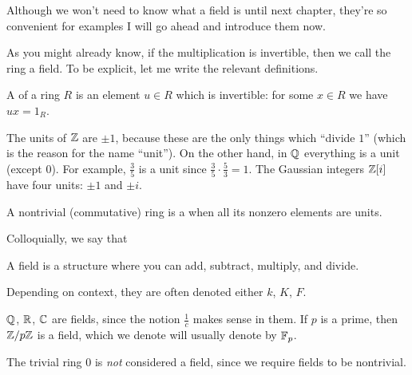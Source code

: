 Although we won't need to know what a field is until next chapter,
they're so convenient for examples I will go ahead and introduce them now.

As you might already know, if the multiplication is invertible,
then we call the ring a field.
To be explicit, let me write the relevant definitions.

\begin{definition}
	\label{def:unit}
	A  of a ring $R$
	is an element $u \in R$ which is invertible:
	for some $x \in R$ we have $ux = 1_R$.
\end{definition}

\begin{example}
	\listhack
	\begin{enumerate}[(a)]
	\ii The units of $\mathbb Z$ are $\pm 1$,
	because these are the only things which ``divide $1$''
	(which is the reason for the name ``unit'').
	\ii On the other hand, in $\mathbb Q$ everything is a unit (except $0$).
	For example, $\frac 35$ is a unit since
	$\frac 35 \cdot \frac 53 = 1$.
	\ii The Gaussian integers $\mathbb Z[i]$ have four units:
	$\pm 1$ and $\pm i$.
	\end{enumerate}
\end{example}

\begin{definition}
	A nontrivial (commutative) ring is a 
	when all its nonzero elements are units.
\end{definition}

Colloquially, we say that
\begin{moral}
	A field is a structure where you can add, subtract, multiply, and divide.
\end{moral}
Depending on context, they are often denoted
either $k$, $K$, $F$.

\begin{example}
	\listhack
	\begin{enumerate}[(a)]
		\ii $\mathbb Q$, $\mathbb R$, $\mathbb C$ are fields,
		since the notion $\frac 1c$ makes sense in them.
		\ii If $p$ is a prime, then $\mathbb Z/p\mathbb Z$ is a field,
		which we denote will usually denote by $\mathbb F_p$.
	\end{enumerate}
	The trivial ring $0$ is \emph{not} considered a field,
	since we require fields to be nontrivial.
\end{example}

%

